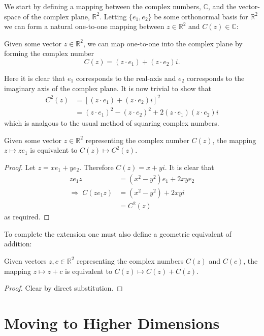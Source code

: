We start by defining a mapping between the complex numbers, $\mathbb{C}$, and
the vector-space of the complex plane, $\mathbb{R}^2$. Letting $\{e_1, e_2\}$
be some orthonormal basis for $\mathbb{R}^2$ we can form a natural one-to-one
mapping between $z \in \mathbb{R}^2$ and $C(z) \in \mathbb{C}$:

\begin{definition}
Given some vector $z \in \mathbb{R}^2$, we can map one-to-one into the
complex plane by forming the complex number
\[
C(z) = (z \cdot e_1) + (z \cdot e_2)i.
\]
\end{definition}

Here it is clear that $e_1$ corresponds to the real-axis and $e_2$ 
corresponds to the imaginary axis of the complex plane.
It is now trivial to show that
\begin{align*}
C^2(z) &= [(z \cdot e_1) + (z \cdot e_2)i]^2 \\
       &= (z \cdot e_1)^2 - (z \cdot e_2)^2 + 2(z \cdot e_1)(z \cdot e_2)i
\end{align*}
which is analgous to the usual method of squaring complex numbers.

\begin{lemma}
Given some vector $z \in \mathbb{R}^2$ representing the complex number
$C(z)$, the mapping $z \mapsto ze_1$ is equivalent to $C(z) \mapsto C^2(z)$.
\end{lemma}
\begin{proof}
Let $z = xe_1 + ye_2$. Therefore $C(z) = x + yi$. It is clear that
\begin{align*}
ze_1z &= (x^2 - y^2) e_1 + 2xye_2 \\
\Rightarrow\;C(ze_1z) &= (x^2 - y^2) + 2xyi\\
        &= C^2(z)
\end{align*}
as required.
\end{proof}

To complete the extension one must also define a geometric equivalent of
addition:
\begin{lemma}
Given vectors $z, c \in \mathbb{R}^2$ representing the complex numbers
$C(z)$ and $C(c)$, the mapping $z \mapsto z + c$ is equivalent to 
$C(z) \mapsto C(z) + C(z)$.
\end{lemma}
\begin{proof}
Clear by direct substitution.
\end{proof}

\section{Moving to Higher Dimensions}


